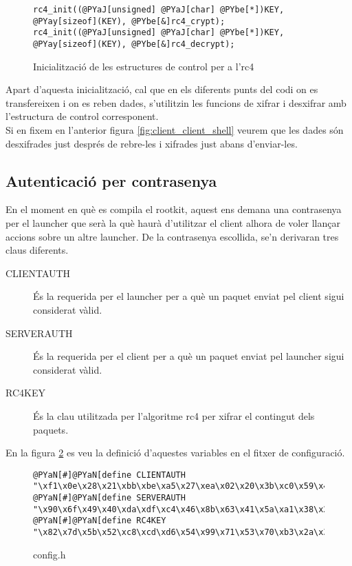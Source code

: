 \begin{figure}[htp]
\begin{Verbatim}[commandchars=@\[\]]
rc4_init((@PYaJ[unsigned] @PYaJ[char] @PYbe[*])KEY, @PYay[sizeof](KEY), @PYbe[&]rc4_crypt);
rc4_init((@PYaJ[unsigned] @PYaJ[char] @PYbe[*])KEY, @PYay[sizeof](KEY), @PYbe[&]rc4_decrypt);
\end{Verbatim}
    \caption{Inicialització de les estructures de control per a l'rc4}
    \label{fig:rc4_inits}
\end{figure}

Apart d'aquesta inicialització, cal que en els diferents punts del codi on es transfereixen i on es reben 
dades, s'utilitzin les funcions de xifrar i desxifrar amb l'estructura de control corresponent. \\

Si en fixem en l'anterior figura \ref{fig:client_client_shell} veurem que les dades són desxifrades just després de rebre-les
i xifrades just abans d'enviar-les.

\subsection{Autenticació per contrasenya}

En el moment en què es compila el rootkit, aquest ens demana una contrasenya per el launcher que serà la 
què haurà d'utilitzar el client alhora de voler llançar accions sobre un altre launcher. De la 
contrasenya escollida, se'n derivaran tres claus diferents. 

\begin{description}
    \item[CLIENTAUTH] És la requerida per el launcher per a què un paquet enviat pel client sigui considerat 
        vàlid.
    \item[SERVERAUTH] És la requerida per el client per a què un paquet enviat pel launcher sigui considerat
        vàlid.
    \item[RC4KEY] És la clau utilitzada per l'algoritme rc4 per xifrar el contingut dels paquets.
\end{description}

En la figura \ref{fig:config} es veu la definició d'aquestes variables en el fitxer de configuració.

\begin{figure}[htp]
\begin{Verbatim}[commandchars=@\[\]]
@PYaN[#]@PYaN[define CLIENTAUTH "\xf1\x0e\x28\x21\xbb\xbe\xa5\x27\xea\x02\x20\x3b\xc0\x59\x44\x51\x90"]
@PYaN[#]@PYaN[define SERVERAUTH "\x90\x6f\x49\x40\xda\xdf\xc4\x46\x8b\x63\x41\x5a\xa1\x38\x25\x30\xf1"]
@PYaN[#]@PYaN[define RC4KEY "\x82\x7d\x5b\x52\xc8\xcd\xd6\x54\x99\x71\x53\x70\xb3\x2a\x37\x22\xe3"]
\end{Verbatim}
    \caption{config.h}
    \label{fig:config}
\end{figure}

